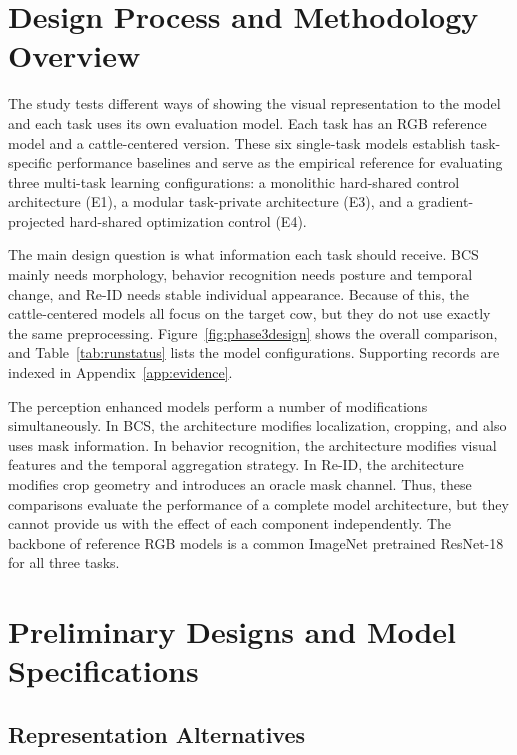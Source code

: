 \section{Design Process and Methodology Overview}

The study tests different ways of showing the visual representation to the model and each task uses its own evaluation model. Each task has an RGB reference model and a cattle-centered version. These six single-task models establish task-specific performance baselines and serve as the empirical reference for evaluating three multi-task learning configurations: a monolithic hard-shared control architecture (E1), a modular task-private architecture (E3), and a gradient-projected hard-shared optimization control (E4).

The main design question is what information each task should receive. BCS mainly needs morphology, behavior recognition needs posture and temporal change, and Re-ID needs stable individual appearance. Because of this, the cattle-centered models all focus on the target cow, but they do not use exactly the same preprocessing. Figure~\ref{fig:phase3design} shows the overall comparison, and Table~\ref{tab:runstatus} lists the model configurations. Supporting records are indexed in Appendix~\ref{app:evidence}.





The perception enhanced models perform a number of modifications simultaneously. In BCS, the architecture modifies localization, cropping, and also uses mask information. In behavior recognition, the architecture modifies visual features and the temporal aggregation strategy. In Re-ID, the architecture modifies crop geometry and introduces an oracle mask channel. Thus, these comparisons evaluate the performance of a complete model architecture, but they cannot provide us with the effect of each component independently. The backbone of reference RGB models is a common ImageNet pretrained ResNet-18 for all three tasks.

\section{Preliminary Designs and Model Specifications}

\subsection{Representation Alternatives}

